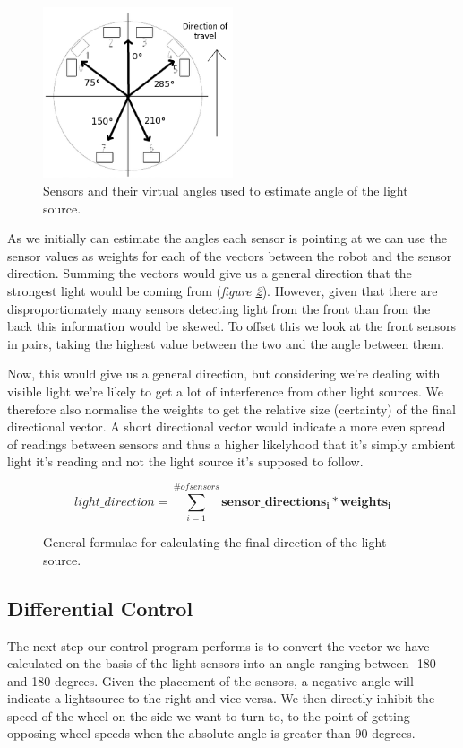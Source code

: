 \documentclass[paper=a4, fontsize=12pt]{scrartcl}	%
\numberwithin{equation}{section}		%
\numberwithin{figure}{section}			%
\numberwithin{table}{section}				%
\begin{document}
\begin{figure}[!ht]
 \centering
  \includegraphics[width=0.5\textwidth]{IRSensors2}
  \caption{Sensors and their virtual angles used to estimate angle of the light source.}
\label{fig:img_sensors}
\end{figure}

As we initially can estimate the angles each sensor is pointing at we can use the sensor values as weights for each of the vectors between the robot and the sensor direction. Summing the vectors would give us a general direction that the strongest light would be coming from (\emph{figure \ref{fig:dir_formula}}). However, given that there are disproportionately many sensors detecting light from the front than from the back this information would be skewed. To offset this we look at the front sensors in pairs, taking the highest value between the two and the angle between them.

Now, this would give us a general direction, but considering we're dealing with visible light we're likely to get a lot of interference from other light sources. We therefore also normalise the weights to get the relative size (certainty) of the final directional vector. A short directional vector would indicate a more even spread of readings between sensors and thus a higher likelyhood that it's simply ambient light it's reading and not the light source it's supposed to follow.

\begin{figure}[!ht]
\[
  light\_direction = \sum_{i=1}^{\# of sensors} \mathbf{sensor\_directions_i}*\mathbf{weights_i}
\]
\caption{General formulae for calculating the final direction of the light source.}
\label{fig:dir_formula}
\end{figure}

\pagebreak
\subsection{Differential Control}
The next step our control program performs is to convert the vector we have calculated on the basis of the light sensors into an angle ranging between -180 and 180 degrees. Given the placement of the sensors, a negative angle will indicate a lightsource to the right and vice versa. We then directly inhibit the speed of the wheel on the side we want to turn to, to the point of getting opposing wheel speeds when the absolute angle is greater than 90 degrees.
\end{document}
